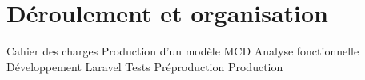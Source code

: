 \section{Déroulement et organisation}

Cahier des charges
Production d'un modèle MCD
Analyse fonctionnelle
Développement Laravel
Tests
Préproduction
Production
